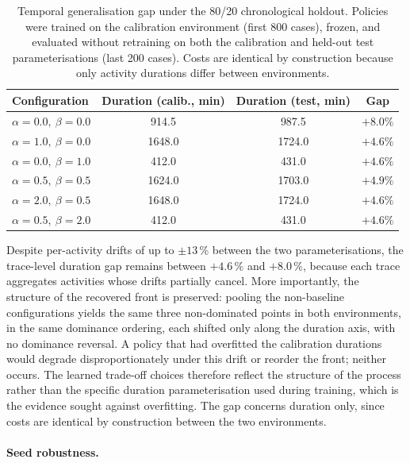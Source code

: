 \begin{table}[H]
\centering
\caption{Temporal generalisation gap under the 80/20 chronological holdout. Policies were trained on the calibration environment (first 800 cases), frozen, and evaluated without retraining on both the calibration and held-out test parameterisations (last 200 cases). Costs are identical by construction because only activity durations differ between environments.}
\label{tab:generalisation_gap}
{\renewcommand{\arraystretch}{1.5}
\setlength{\tabcolsep}{6pt}
\begin{tabular}{lccc}
\toprule
\textbf{Configuration} &
\textbf{Duration (calib., min)} &
\textbf{Duration (test, min)} &
\textbf{Gap} \\
\midrule
$\alpha=0.0,\ \beta=0.0$ & 914.5 & 987.5 & $+8.0\%$ \\
$\alpha=1.0,\ \beta=0.0$ & 1648.0 & 1724.0 & $+4.6\%$ \\
$\alpha=0.0,\ \beta=1.0$ & 412.0 & 431.0 & $+4.6\%$ \\
$\alpha=0.5,\ \beta=0.5$ & 1624.0 & 1703.0 & $+4.9\%$ \\
$\alpha=2.0,\ \beta=0.5$ & 1648.0 & 1724.0 & $+4.6\%$ \\
$\alpha=0.5,\ \beta=2.0$ & 412.0 & 431.0 & $+4.6\%$ \\
\bottomrule
\end{tabular}}
\end{table}
Despite per-activity drifts of up to $\pm 13\,\%$ between the two
parameterisations, the trace-level duration gap remains between
$+4.6\,\%$ and $+8.0\,\%$, because each trace aggregates activities
whose drifts partially cancel. More importantly, the structure of the
recovered front is preserved: pooling the non-baseline configurations
yields the same three non-dominated points in both environments, in the
same dominance ordering, each shifted only along the duration axis, with
no dominance reversal. A policy that had overfitted the calibration
durations would degrade disproportionately under this drift or reorder
the front; neither occurs. The learned trade-off choices therefore
reflect the structure of the process rather than the specific duration
parameterisation used during training, which is the evidence sought
against overfitting. The gap concerns duration only, since costs are
identical by construction between the two environments.

\paragraph{Seed robustness.}

